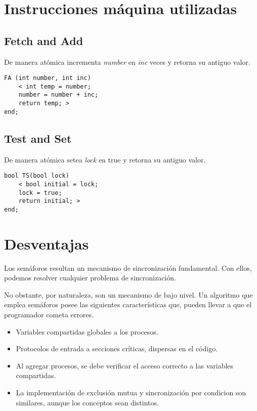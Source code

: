 \documentclass[a4paper, 10pt]{report}
\begin{document}
\section{Instrucciones máquina utilizadas}

\subsection{Fetch and Add}
De manera atómica incrementa \emph{number} en \emph{inc} veces y retorna su antiguo valor.

\begin{lstlisting}
FA (int number, int inc)
    < int temp = number;
    number = number + inc;
    return temp; >
end;
\end{lstlisting}

\subsection{Test and Set}

De manera atómica setea \emph{lock} en true y retorna su antiguo valor.

\begin{lstlisting}
bool TS(bool lock)
    < bool initial = lock; 
    lock = true; 
    return initial; >
end;
\end{lstlisting}

\section{Desventajas}

Los semáforos resultan un mecanismo de sincronización fundamental. Con ellos, podemos resolver cualquier problema de sincronización.

No obstante, por naturaleza, son un mecanismo de bajo nivel. Un algoritmo que emplea semáforos posee las siguientes características que, pueden llevar a que el programador cometa errores.

\begin{itemize}
    \item Variables compartidas globales a los procesos.
    \item Protocolos de entrada a secciones críticas, dispersas en el código.
    \item Al agregar procesos, se debe verificar el acceso correcto a las variables compartidas.
    \item La implementación de exclusión mutua y sincronización por condicion son similares, aunque los conceptos sean distintos.
\end{itemize}
\end{document}
